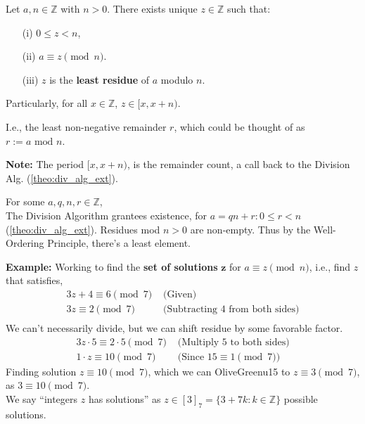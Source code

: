 \newpage

\begin{theo}

    Let \(a, n \in \mathbb{Z}\) with \(n > 0\). There exists unique $z \in \mathbb{Z}$ such that:
    \begin{itemize}
        \item [(i)] \(0 \leq z < n\),
        \item [(ii)] \(a \equiv z \pmod{n}\).
        \item [(iii)] \(z\) is the \textbf{least residue} of \(a\) modulo \(n\).
    \end{itemize}
    Particularly, for all $x\in\mathbb{Z}$, $z\in[x,x+n)$.
\end{theo}
I.e., the least non-negative remainder $r$, which could be thought of as $r:=a\text{ mod } n$.
\begin{Note}
    \textbf{Note:} The period $[x,x+n)$, is the remainder count, a call back to the Division Alg. (\ref{theo:div_alg_ext}).
\end{Note}

\begin{Proof}

    For some $a,q,n,r\in\mathbb{Z}$,\\
    The Division Algorithm grantees existence, for $a=qn+r:0\leq r<n$ (\ref{theo:div_alg_ext}). Residues 
    mod $n>0$ are non-empty. Thus by the Well-Ordering Principle, there's a least element.
\end{Proof}

\noindent
\textbf{Example:} Working to find the \textbf{set of solutions} $\mathbf{z}$ for $a\equiv z\pmod{n}$, i.e., find $z$ that satisfies,
\begin{align*}
3z+4 \equiv 6 \pmod{7} & \text{ (Given)} \\
3z \equiv 2 \pmod{7} & \text{ (Subtracting 4 from both sides)} \\
\end{align*}
We can't necessarily divide, but we can shift residue by some favorable factor.
\begin{align*}
3z\cdot5 \equiv 2\cdot5 \pmod{7} & \text{ (Multiply 5 to both sides)} \\
1\cdot z\equiv 10 \pmod{7} & \text{ (Since $15\equiv1\pmod{7}$)} 
\end{align*}
Finding solution $z\equiv10\pmod{7}$, which we can OliveGreenu15 to $z\equiv 3\pmod{7}$, as $3\equiv10\pmod{7}$.\\
We say ``integers $z$ has solutions'' as $z\in[3]_{7}=\{3+7k:k\in\mathbb{Z}\}$ possible solutions.\\

